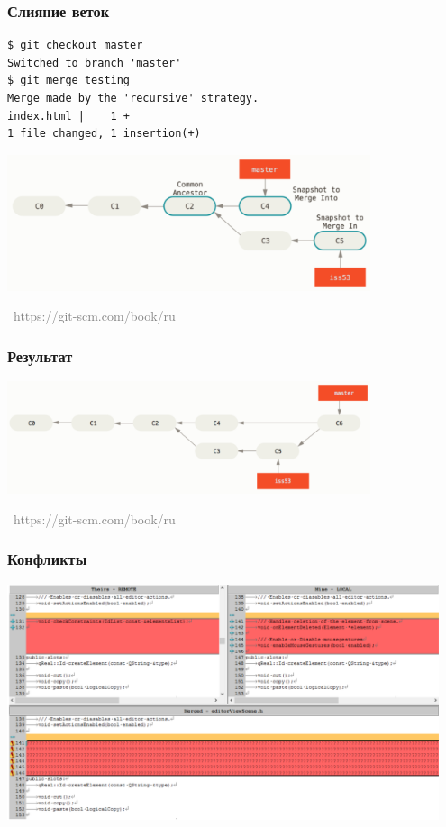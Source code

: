 \documentclass[xetex,mathserif,serif]{beamer}
\newcommand{\attribution}[1] {
    \vspace{-5mm}\begin{flushright}\begin{scriptsize}\textcolor{gray}{\textcopyright\, #1}\end{scriptsize}\end{flushright}
}
\begin{document}
    \begin{frame}[fragile]
        \frametitle{Слияние веток}
        \begin{verbatim}
$ git checkout master
Switched to branch 'master'
$ git merge testing
Merge made by the 'recursive' strategy.
index.html |    1 +
1 file changed, 1 insertion(+)
        \end{verbatim}
        \begin{center}
            \includegraphics[width=0.8\textwidth]{merge.png}
            \attribution{https://git-scm.com/book/ru}
        \end{center}
    \end{frame}

    \begin{frame}
        \frametitle{Результат}
        \begin{center}
            \includegraphics[width=0.8\textwidth]{mergeResult.png}
            \attribution{https://git-scm.com/book/ru}
        \end{center}
    \end{frame}

    \begin{frame}
        \frametitle{Конфликты}
        \begin{center}
            \includegraphics[width=0.95\textwidth]{conflicts.png}
        \end{center}
    \end{frame}
\end{document}
